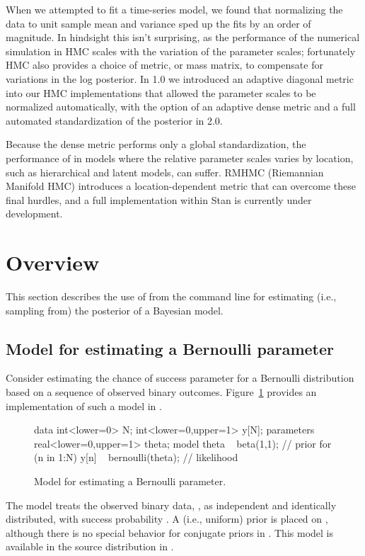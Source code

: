 \documentclass[article]{jss}
\begin{document}
When we attempted to fit a time-series model, we found that
normalizing the data to unit sample mean and variance sped up the fits
by an order of magnitude.  In hindsight this isn't surprising, as the 
performance of the numerical simulation in HMC scales with the variation 
of the parameter scales; fortunately HMC also provides a choice of metric,
or mass matrix, to compensate for variations in the log posterior.
In  1.0 we introduced an adaptive 
diagonal metric into our HMC implementations that allowed the parameter 
scales to be normalized automatically, with the option of an adaptive dense 
metric and a full automated standardization of the posterior in  2.0.

Because the dense metric performs only a global standardization, the
performance of  in models where the relative parameter
scales varies by location, such as hierarchical and latent models, can suffer.
RMHMC (Riemannian Manifold HMC) \citep{GirolamiCalderhead:2011}
introduces a location-dependent metric that can overcome these final
hurdles, and a full implementation within Stan is currently under development.

\section{Overview}

This section describes the use of  from the command
line for estimating (i.e., sampling from) the posterior of a Bayesian
model.

\subsection{Model for estimating a Bernoulli parameter}

Consider estimating the chance of success parameter for a Bernoulli
distribution based on a sequence of observed binary outcomes.  
Figure~\ref{bernoulli-model.fig} provides an implementation of such a
model in .
%
\begin{figure}
\begin{Code}
data { 
  int<lower=0> N; 
  int<lower=0,upper=1> y[N];
} 
parameters {
  real<lower=0,upper=1> theta;
} 
model {
  theta ~ beta(1,1);  // prior
  for (n in 1:N) 
    y[n] ~ bernoulli(theta);  // likelihood
}
\end{Code}
\caption{Model for estimating a Bernoulli parameter.}\label{bernoulli-model.fig}
\end{figure}
%
The model treats the observed binary data, , as
independent and identically distributed, with success probability .  
A  (i.e., uniform) prior is placed on  , although there is no
special behavior for conjugate priors in .  This model
is available in the  source distribution in
.
\end{document}
